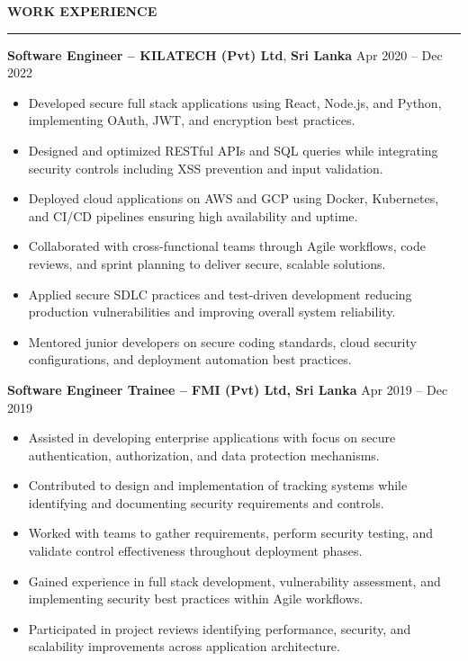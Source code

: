 \documentclass[10pt,letterpaper]{article}
\begin{document}
\vspace{8pt}

\textbf{WORK EXPERIENCE}\\[-8pt]
\noindent\rule{\textwidth}{1pt}

\vspace{-2pt}

\textbf{Software Engineer -- KILATECH (Pvt) Ltd}, \textbf{Sri Lanka} \hfill Apr 2020 -- Dec 2022

\vspace{-1pt}

\begin{itemize}
\item Developed secure full stack applications using React, Node.js, and Python, implementing OAuth, JWT, and encryption best practices.
\item Designed and optimized RESTful APIs and SQL queries while integrating security controls including XSS prevention and input validation.
\item Deployed cloud applications on AWS and GCP using Docker, Kubernetes, and CI/CD pipelines ensuring high availability and uptime.
\item Collaborated with cross-functional teams through Agile workflows, code reviews, and sprint planning to deliver secure, scalable solutions.
\item Applied secure SDLC practices and test-driven development reducing production vulnerabilities and improving overall system reliability.
\item Mentored junior developers on secure coding standards, cloud security configurations, and deployment automation best practices.
\end{itemize}

\textbf{Software Engineer Trainee -- FMI (Pvt) Ltd, Sri Lanka} \hfill Apr 2019 -- Dec 2019

\vspace{-1pt}

\begin{itemize}
\item Assisted in developing enterprise applications with focus on secure authentication, authorization, and data protection mechanisms.
\item Contributed to design and implementation of tracking systems while identifying and documenting security requirements and controls.
\item Worked with teams to gather requirements, perform security testing, and validate control effectiveness throughout deployment phases.
\item Gained experience in full stack development, vulnerability assessment, and implementing security best practices within Agile workflows.
\item Participated in project reviews identifying performance, security, and scalability improvements across application architecture.
\end{itemize}
\end{document}
